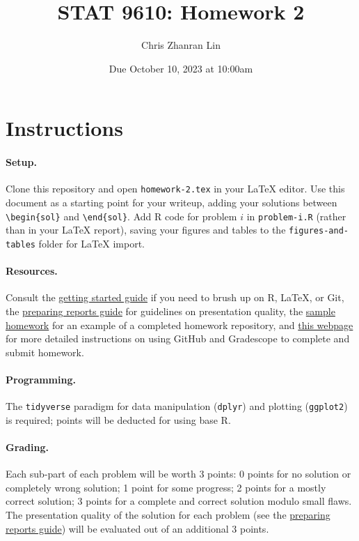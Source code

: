 \documentclass[11pt,letterpaper,english,oneside]{article} %
\author{Chris Zhanran Lin}
\title{STAT 9610: Homework 2}
\date{Due October 10, 2023 at 10:00am}
\theoremstyle{definition} %
\newtheorem{solution}{Solution}
\newenvironment{sol}{\begin{solution}\hspace{0pt}}{\end{solution}}
\begin{document}
\maketitle

\section{Instructions}

\paragraph{Setup.} Clone this repository and open \verb|homework-2.tex| in your LaTeX editor. Use this document as a starting point for your writeup, adding your solutions between \verb|\begin{sol}| and \verb|\end{sol}|. Add R code for problem $i$ in \verb|problem-i.R| (rather than in your LaTeX report), saving your figures and tables to the \verb|figures-and-tables| folder for LaTeX import. 

\paragraph{Resources.}

Consult the \href{https://katsevich-teaching.github.io/stat-9610-fall-2023/assets/getting-started.pdf}{getting started guide} if you need to brush up on R, LaTeX, or Git, the \href{https://katsevich-teaching.github.io/stat-9610-fall-2023/assets/preparing-reports.pdf}{preparing reports guide} for guidelines on presentation quality, the \href{https://github.com/stat-9610-fall-2023/sample-homework-stat-9610}{sample homework} for an example of a completed homework repository, and \href{https://hmc-cs-131-spring2020.github.io/howtos/assignments.html}{this webpage} for more detailed instructions on using GitHub and Gradescope to complete and submit homework.

\paragraph{Programming.}

The \verb|tidyverse| paradigm for data manipulation (\verb|dplyr|) and plotting (\verb|ggplot2|) is required; points will be deducted for using base R. 

\paragraph{Grading.} Each sub-part of each problem will be worth 3 points: 0 points for no solution or completely wrong solution; 1 point for some progress; 2 points for a mostly correct solution; 3 points for a complete and correct solution modulo small flaws. The presentation quality of the solution for each problem (see the \href{https://katsevich-teaching.github.io/stat-9610-fall-2023/assets/preparing-reports.pdf}{preparing reports guide}) will be evaluated out of an additional 3 points.
\end{document}
